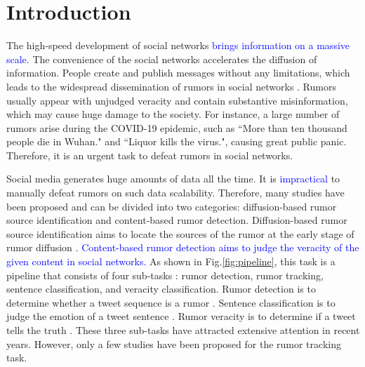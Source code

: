 \section{Introduction}
\label{sec:introduction}
The high-speed development of social networks \textcolor{blue}{brings information on a massive scale}. The convenience of the social networks accelerates the diffusion of information. People create and publish messages without any limitations, which leads to the widespread dissemination of rumors in social networks \cite{DBLP:journals/corr/KurkaGZ15, DBLP:journals/csur/ZubiagaABLP18, DBLP:conf/sirocco/KostkaOW08, vosoughi2018spread}. Rumors usually appear with unjudged veracity and contain substantive misinformation, which may cause huge damage to the society. For instance, a large number of rumors arise during the COVID-19 epidemic, such as ``More than ten thousand people die in Wuhan." and ``Liquor kills the virus.", causing great public panic. Therefore, it is an urgent task to defeat rumors in social networks.

Social media generates huge amounts of data all the time. It is \textcolor{blue}{impractical} to manually defeat rumors on such data scalability. Therefore, many studies have been proposed and can be divided into two categories: diffusion-based rumor source identification and content-based rumor detection. Diffusion-based rumor source identification aims to locate the sources of the rumor at the early stage of rumor diffusion \cite{DBLP:conf/sigmetrics/ShahZ10, DBLP:journals/tit/ShahZ11, DBLP:conf/kdd/LappasTGM10}. \textcolor{blue}{Content-based rumor detection aims to judge the veracity of the given content in social networks.} As shown in Fig.\ref{fig:pipeline}, this task is a pipeline that consists of four sub-tasks \cite{DBLP:journals/csur/ZubiagaABLP18, DBLP:conf/coling/KochkinaLZ18}: rumor detection, rumor tracking, sentence classification, and veracity classification. Rumor detection is to determine whether a tweet sequence is a rumor  \cite{DBLP:conf/socinfo/ZubiagaLP17, DBLP:conf/www/Ma0W19,DBLP:conf/naacl/NguyenDCD19, DBLP:journals/corr/abs-1906-05659}. Sentence classification is to judge the emotion of a tweet sentence \cite{DBLP:conf/semeval/EnayetE17, DBLP:conf/semeval/X17a, DBLP:conf/coling/ZubiagaKLPL16}. Rumor veracity is to determine if a tweet tells the truth \cite{DBLP:conf/coling/KochkinaLZ18, DBLP:conf/acl/LiZS19, DBLP:conf/acl/KumarC19}. These three sub-tasks have attracted extensive attention in recent years. However, only a few studies have been proposed for the rumor tracking task.

